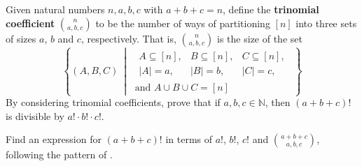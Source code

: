 \begin{exercise}
\label{exTrinomialCoefficients}
Given natural numbers $n,a,b,c$ with $a+b+c=n$, define the \textbf{trinomial coefficient} $\displaystyle \binom{n}{a,b,c}$  to be the number of ways of partitioning $[n]$ into three sets of sizes $a$, $b$ and $c$, respectively. That is, $\displaystyle \binom{n}{a,b,c}$ is the size of the set
\[ \left\{ (A,B,C)\ \middle|\ 
\begin{matrix} \begin{matrix} A \subseteq [n], & B \subseteq [n], & C \subseteq[n], \\ |A|=a, & |B|=b, & |C|=c, \end{matrix} \\ \text{and } A \cup B \cup C = [n] \end{matrix} \right\} \]
By considering trinomial coefficients, prove that if $a,b,c \in \mathbb{N}$, then $(a+b+c)!$ is divisible by $a! \cdot b! \cdot c!$.
\begin{backhint}
Find an expression for $(a+b+c)!$ in terms of $a!$, $b!$, $c!$ and $\binom{a+b+c}{a,b,c}$, following the pattern of .
\end{backhint}
\end{exercise}

